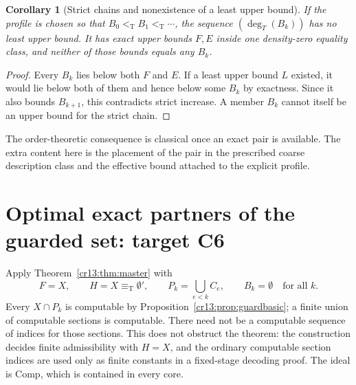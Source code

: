\documentclass[11pt,letterpaper]{article}
\newtheorem{corollary}[theorem]{Corollary}
\theoremstyle{definition}
\theoremstyle{remark}\newtheorem{remark}[theorem]{Remark}
\numberwithin{equation}{section}
\newcommand{\ltT}{<_{\mathrm T}}
\newcommand{\eqT}{\equiv_{\mathrm T}}
\newcommand{\Comp}{\mathrm{Comp}}
\begin{document}
\begin{corollary}[Strict chains and nonexistence of a least upper bound]\label{cr13:cor:nolub}
If the profile is chosen so that $B_0\ltT B_1\ltT\cdots$, the sequence $(\deg_T(B_k))$ has no least upper bound. It has exact upper bounds $F,E$ inside one density-zero equality class, and neither of those bounds equals any $B_k$.
\end{corollary}
\begin{proof}
Every $B_k$ lies below both $F$ and $E$. If a least upper bound $L$ existed, it would lie below both of them and hence below some $B_k$ by exactness. Since it also bounds $B_{k+1}$, this contradicts strict increase. A member $B_k$ cannot itself be an upper bound for the strict chain.
\end{proof}
The order-theoretic consequence is classical once an exact pair is available. The extra content here is the placement of the pair in the prescribed coarse description class and the effective bound attached to the explicit profile.

\section{Optimal exact partners of the guarded set: target C6}
\label{cr13:sec:optimal}
Apply Theorem~\ref{cr13:thm:master} with
\begin{equation}\label{cr13:eq:guardapply}
 F=X,\qquad H=X\eqT\emptyset',\qquad
 P_k=\bigcup_{e<k}C_e,\qquad B_k=\emptyset\quad\text{for all }k.
\end{equation}
Every $X\cap P_k$ is computable by Proposition~\ref{cr13:prop:guardbasic}; a finite union of computable sections is computable. There need not be a computable sequence of indices for those sections. This does not obstruct the theorem: the construction decides finite admissibility with $H=X$, and the ordinary computable section indices are used only as finite constants in a fixed-stage decoding proof. The ideal is $\Comp$, which is contained in every core.
\end{document}
